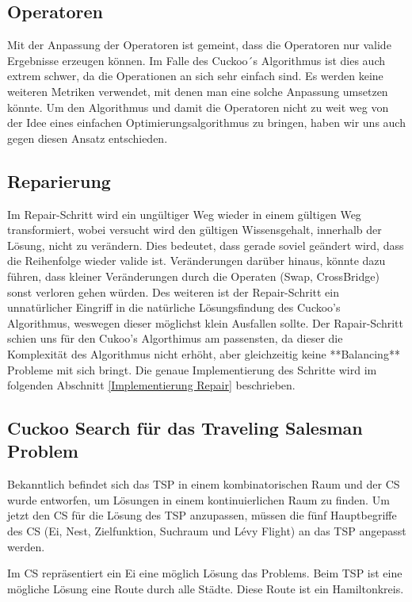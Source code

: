 \documentclass[conference]{IEEEtran}
\begin{document}
    \subsection{Operatoren}
      Mit der Anpassung der Operatoren ist gemeint, dass die Operatoren nur valide Ergebnisse erzeugen 
      können. Im Falle des Cuckoo´s Algorithmus ist dies auch extrem schwer, da die Operationen 
      an sich sehr einfach sind. Es werden keine weiteren Metriken verwendet, mit denen man eine 
      solche Anpassung umsetzen könnte. Um den Algorithmus und damit die Operatoren nicht zu weit
      weg von der Idee eines einfachen Optimierungsalgorithmus zu bringen, haben wir uns auch 
      gegen diesen Ansatz entschieden.

    \subsection{Reparierung}
      Im Repair-Schritt wird ein ungültiger Weg wieder in einem gültigen Weg transformiert, wobei 
      versucht wird den gültigen Wissensgehalt, innerhalb der Lösung, nicht zu verändern. Dies bedeutet, 
      dass gerade soviel geändert wird, dass die Reihenfolge wieder valide ist. Veränderungen darüber hinaus, 
      könnte dazu führen, dass kleiner Veränderungen durch die Operaten (Swap, CrossBridge) sonst verloren gehen würden.
      Des weiteren ist der Repair-Schritt ein unnatürlicher Eingriff in die natürliche Lösungsfindung des Cuckoo's Algorithmus, 
      weswegen dieser möglichst klein Ausfallen sollte.
      Der Rapair-Schritt schien uns für den Cukoo's Algorthimus am passensten, da dieser die Komplexität des Algorithmus nicht erhöht, aber 
      gleichzeitig keine **Balancing** Probleme mit sich bringt. Die genaue Implementierung des Schritte wird im folgenden Abschnitt \ref{Implementierung Repair}
      beschrieben.

    \subsection{Cuckoo Search für das Traveling Salesman Problem}
      Bekanntlich befindet sich das TSP in einem kombinatorischen Raum und der CS wurde entworfen, 
      um Lösungen in einem kontinuierlichen Raum zu finden. Um jetzt den CS für die Lösung des TSP anzupassen, 
      müssen die fünf Hauptbegriffe des CS (Ei, Nest, Zielfunktion, Suchraum und Lévy Flight) an das TSP angepasst werden. 

      Im CS repräsentiert ein Ei eine möglich Lösung das Problems. Beim TSP ist eine mögliche Lösung eine 
      Route durch alle Städte. Diese Route ist ein Hamiltonkreis.
\end{document}
